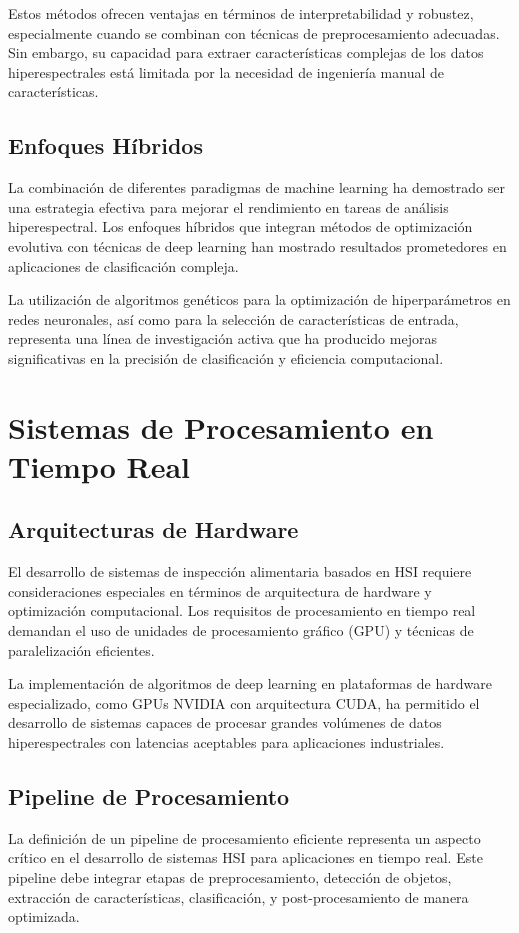 Estos métodos ofrecen ventajas en términos de interpretabilidad y robustez, especialmente cuando se combinan con técnicas de preprocesamiento adecuadas. Sin embargo, su capacidad para extraer características complejas de los datos hiperespectrales está limitada por la necesidad de ingeniería manual de características.

\subsection{Enfoques Híbridos}
La combinación de diferentes paradigmas de machine learning ha demostrado ser una estrategia efectiva para mejorar el rendimiento en tareas de análisis hiperespectral. Los enfoques híbridos que integran métodos de optimización evolutiva con técnicas de deep learning han mostrado resultados prometedores en aplicaciones de clasificación compleja.

La utilización de algoritmos genéticos para la optimización de hiperparámetros en redes neuronales, así como para la selección de características de entrada, representa una línea de investigación activa que ha producido mejoras significativas en la precisión de clasificación y eficiencia computacional.

\section{Sistemas de Procesamiento en Tiempo Real}

\subsection{Arquitecturas de Hardware}
El desarrollo de sistemas de inspección alimentaria basados en HSI requiere consideraciones especiales en términos de arquitectura de hardware y optimización computacional. Los requisitos de procesamiento en tiempo real demandan el uso de unidades de procesamiento gráfico (GPU) y técnicas de paralelización eficientes.

La implementación de algoritmos de deep learning en plataformas de hardware especializado, como GPUs NVIDIA con arquitectura CUDA, ha permitido el desarrollo de sistemas capaces de procesar grandes volúmenes de datos hiperespectrales con latencias aceptables para aplicaciones industriales.

\subsection{Pipeline de Procesamiento}
La definición de un pipeline de procesamiento eficiente representa un aspecto crítico en el desarrollo de sistemas HSI para aplicaciones en tiempo real. Este pipeline debe integrar etapas de preprocesamiento, detección de objetos, extracción de características, clasificación, y post-procesamiento de manera optimizada.

